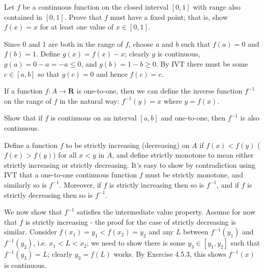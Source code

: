 \begin{exercise}
  Let $f$ be a continuous function on the closed interval $[0,1]$ with range also contained in $[0,1]$. Prove that $f$ must have a fixed point; that is, show $f(x)=x$ for at least one value of $x \in[0,1]$.
\end{exercise}
\begin{solution}
    Since 0 and 1 are both in the range of \(f\), choose \(a\) and \(b\) such that \(f(a) = 0\) and \(f(b) = 1\). Define \(g(x) = f(x) - x\); clearly \(g\) is continuous, \(g(a) = 0 - a = -a \leq 0\), and \(g(b) = 1 - b \geq 0\). By IVT there must be some \(c \in [a, b]\) so that \(g(c) = 0\) and hence \(f(c) = c\).
\end{solution}

\begin{exercise}
  If a function $f: A \rightarrow \mathbf{R}$ is one-to-one, then we can define the inverse function $f^{-1}$ on the range of $f$ in the natural way: $f^{-1}(y)=x$ where $y=f(x)$.

  Show that if $f$ is continuous on an interval $[a, b]$ and one-to-one, then $f^{-1}$ is also continuous.
\end{exercise}

\begin{solution}
Define a function \(f\) to be strictly increasing (decreasing) on $A$ if $f(x) < f(y)$ (\(f(x) > f(y)\)) for all $x<y$ in $A$, and define strictly monotone to mean either strictly increasing or strictly decreasing. It's easy to show by contradiction using IVT that a one-to-one continuous function \(f\) must be strictly monotone, and similarly so is \(f^{-1}\). Moreover, if \(f\) is strictly increasing then so is \(f^{-1}\), and if \(f\) is strictly decreasing then so is \(f^{-1}\).

We now show that \(f^{-1}\) satisfies the intermediate value property. Assume for now that \(f\) is strictly increasing - the proof for the case of strictly decreasing is similar. Consider \(f(x_1) = y_1 < f(x_2) = y_2\) and any \(L\) between \(f^{-1}(y_1)\) and \(f^{-1}(y_2)\), i.e. \(x_1 < L < x_2\); we need to show there is some \(y_3 \in [y_1, y_2]\) such that \(f^{-1}(y_3) = L\); clearly \(y_3 = f(L)\) works. By Exercise 4.5.3, this shows \(f^{-1}(x)\) is continuous.
\end{solution}

